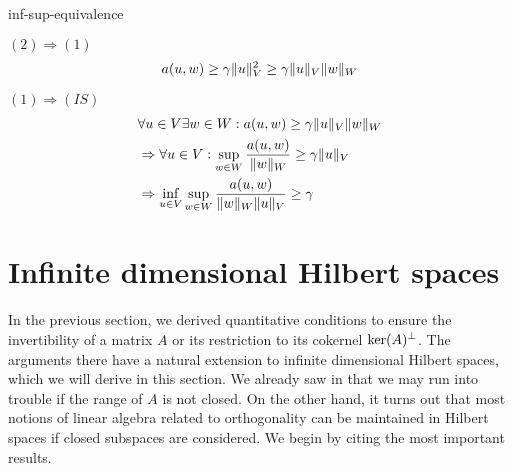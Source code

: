 \begin{Problem}{inf-sup-equivalence}
\begin{solution}
  $(2)\Rightarrow(1)$ \\
  \begin{align*}
  a(u,w) \ge \gamma \lVert u\rVert_V^2 \ge \gamma \lVert u\rVert_V \lVert w\rVert_W
  \end{align*}

  $(1)\Rightarrow(IS)$ \\
  \begin{align*}
  &\forall u\in V \exists w\in W: a(u,w)\ge \gamma \lVert u\rVert_V\lVert w\rVert_W\\
  &\Rightarrow \forall u\in V: \sup_{w\in W} \frac{a(u,w)}{\lVert w\rVert_W}\ge \gamma \lVert u\rVert_V\\
  &\Rightarrow \inf_{u\in V}\sup_{w\in W} \frac{a(u,w)}{\lVert w\rVert_W\lVert u\rVert_V}\ge \gamma
  \end{align*}
\end{solution}
\end{Problem}


\section{Infinite dimensional Hilbert spaces}

\begin{intro}
  In the previous section, we derived quantitative conditions to
  ensure the invertibility of a matrix $A$ or its restriction to its
  cokernel $\operatorname{ker}(A)^\perp$. The arguments there have a natural
  extension to infinite dimensional Hilbert spaces, which we will
  derive in this section. We already saw in
   that we may run into trouble
  if the range of $A$ is not closed. On the other hand, it turns out
  that most notions of linear algebra related to orthogonality can be
  maintained in Hilbert spaces if closed subspaces are considered.
  We begin by citing the most important results.
\end{intro}

